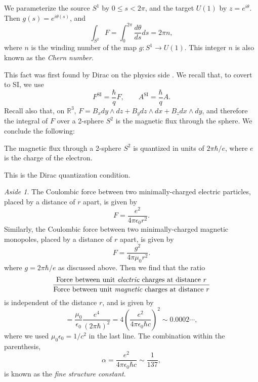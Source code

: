 \documentclass[12pt]{article}
\numberwithin{equation}{section}
\theoremstyle{remark}
\newtheorem{aside}[definition]{Aside}
\def\bR{\mathbb{R}}
\begin{document}
We parameterize the source $S^1$ by $0\le s < 2\pi$,
and the target $U(1)$ by $z=e^{i\theta}$.
Then $g(s)=e^{i\theta(s)}$, and \begin{equation}
\int_{S^2} F = \int_0^{2\pi} \frac{d\theta}{ds} ds = 2\pi n,
\end{equation}
where $n$ is the winding number of the map $g:S^1\to U(1)$.
This integer $n$ is also known as the \emph{Chern number}.

This fact was first found by Dirac on the physics side \cite{Dirac}.
We recall that, to covert to SI, we use \begin{equation}
  F^\text{SI} = \frac{\hbar}{q} F,\qquad
  A^\text{SI} = \frac{\hbar}{q} A.
\end{equation} 
Recall also that, on $\bR^3$,
$F=B_{x}dy\wedge dz + B_{y}dz\wedge dx + B_{z}dx\wedge dy$,
and therefore the integral of $F$ over a 2-sphere $S^2$ is the magnetic flux through the sphere.
We conclude the following:
\begin{proposition}
The magnetic flux through a 2-sphere $S^2$ is quantized in units of $2\pi \hbar/e$,
where $e$ is the charge of the electron.
\end{proposition}
This is the Dirac quantization condition.

\begin{aside}
The Coulombic force between two minimally-charged electric particles, 
placed by a distance of $r$ apart, is given by \begin{equation}
  F = \frac{e^2}{4\pi \epsilon_0 r^2}.
\end{equation} 
Similarly, the Coulombic force between two minimally-charged magnetic monopoles,
placed by a distance of $r$ apart, is given by \begin{equation}
  F = \frac{g^2}{4\pi \mu_0 r^2}.
\end{equation} where $g=2\pi \hbar/e$ as discussed above.
Then we find that the ratio \begin{equation}
\frac{\text{Force between unit \emph{electric} charges at distance $r$}}
{\text{Force between unit \emph{magnetic} charges at distance $r$}}
\end{equation}
is independent of the distance $r$, and is given by 
\begin{equation}
= \frac{\mu_0}{\epsilon_0} \frac{e^4}{(2\pi \hbar)^2}
= 4 (\frac{e^2}{4\pi \epsilon_0 \hbar c })^2 \sim 0.0002\cdots,
\end{equation} 
where we used $\mu_0 \epsilon_0=1/c^2$ in the last line.
The combination within the parenthesis, \begin{equation}
\alpha = \frac{e^2}{4\pi \epsilon_0 \hbar c } \sim \frac{1}{137},
\end{equation} is known as the \emph{fine structure constant}.
\end{aside}
\end{document}
